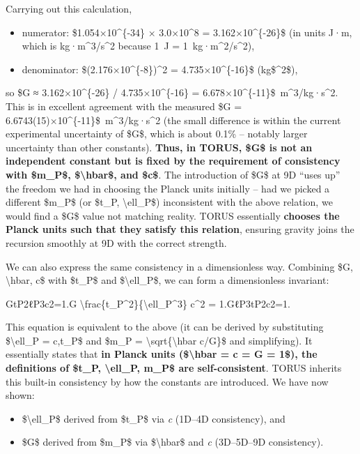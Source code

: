 \documentclass[]{article}
\begin{document}
Carrying out this calculation,

\begin{itemize}
\item
  numerator: \$1.054×10\^{}\{-34\} × 3.0×10\^{}8 = 3.162×10\^{}\{-26\}\$
  (in units J·m, which is kg·m\^{}3/s\^{}2 because 1~J =
  1~kg·m\^{}2/s\^{}2),
\item
  denominator: \$(2.176×10\^{}\{-8\})\^{}2 = 4.735×10\^{}\{-16\}\$
  (kg\$\^{}2\$),
\end{itemize}

so \$G ≈ 3.162×10\^{}\{-26\} / 4.735×10\^{}\{-16\} =
6.678×10\^{}\{-11\}\$~m\^{}3/kg·s\^{}2. This is in excellent agreement
with the measured \$G = 6.6743(15)×10\^{}\{-11\}\$~m\^{}3/kg·s\^{}2 (the
small difference is within the current experimental uncertainty of
\$G\$, which is about 0.1\% -- notably larger uncertainty than other
constants). \textbf{Thus, in TORUS, \$G\$ is not an independent constant
but is fixed by the requirement of consistency with \$m\_P\$,
\$\textbackslash{}hbar\$, and \$c\$}​. The introduction of \$G\$ at 9D
``uses up'' the freedom we had in choosing the Planck units initially --
had we picked a different \$m\_P\$ (or \$t\_P, \textbackslash{}ell\_P\$)
inconsistent with the above relation, we would find a \$G\$ value not
matching reality. TORUS essentially \textbf{chooses the Planck units
such that they satisfy this relation}, ensuring gravity joins the
recursion smoothly at 9D with the correct strength.

We can also express the same consistency in a dimensionless way.
Combining \$G, \textbackslash{}hbar, c\$ with \$t\_P\$ and
\$\textbackslash{}ell\_P\$, we can form a dimensionless invariant:

GtP2ℓP3c2=1.G
\textbackslash{}frac\{t\_P\^{}2\}\{\textbackslash{}ell\_P\^{}3\} c\^{}2
= 1.GℓP3​tP2​​c2=1.

This equation is equivalent to the above (it can be derived by
substituting \$\textbackslash{}ell\_P = c,t\_P\$ and \$m\_P =
\textbackslash{}sqrt\{\textbackslash{}hbar c/G\}\$ and simplifying). It
essentially states that \textbf{in Planck units (\$\textbackslash{}hbar
= c = G = 1\$), the definitions of \$t\_P, \textbackslash{}ell\_P,
m\_P\$ are self-consistent}. TORUS inherits this built-in consistency by
how the constants are introduced. We have now shown:

\begin{itemize}
\item
  \$\textbackslash{}ell\_P\$ derived from \$t\_P\$ via \emph{c} (1D--4D
  consistency), and
\item
  \$G\$ derived from \$m\_P\$ via \$\textbackslash{}hbar\$ and \emph{c}
  (3D--5D--9D consistency).
\end{itemize}
\end{document}
